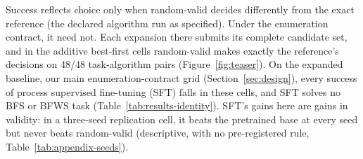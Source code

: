 Success reflects choice only when random-valid decides differently from the exact reference (the declared algorithm run as specified). Under the enumeration contract, it need not.
Each expansion there submits its complete candidate set, and in the additive best-first cells random-valid makes exactly the reference's decisions on 48/48 task-algorithm pairs (Figure~\ref{fig:teaser}).
On the expanded baseline, our main enumeration-contract grid (Section~\ref{sec:design}), every success of process supervised fine-tuning (SFT) falls in these cells, and SFT solves no BFS or BFWS task (Table~\ref{tab:results-identity}).
SFT's gains here are gains in validity: in a three-seed replication cell, it beats the pretrained base at every seed but never beats random-valid (descriptive, with no pre-registered rule, Table~\ref{tab:appendix-seeds}).

